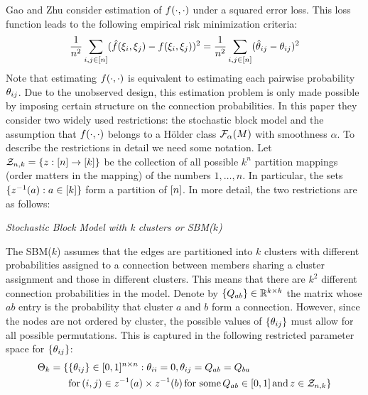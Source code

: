 \documentclass[11pt]{article}
\begin{document}
Gao and Zhu consider estimation of $f(\cdot, \cdot)$ under a squared error loss. This loss function leads to the following empirical risk minimization criteria:
\begin{equation}\label{eq:loss_func}
\frac{1}{n^2}\sum_{i, j \in \lbrack n\rbrack}(\hat{f}(\xi_i, \xi_j) - f(\xi_i, \xi_j))^2 =
\frac{1}{n^2}\sum_{i, j \in \lbrack n\rbrack}(\hat{\theta}_{ij} - \theta_{ij})^2
\end{equation}
Note that estimating $f(\cdot, \cdot)$ is equivalent to estimating each pairwise probability $\theta_{ij}$. Due to the unobserved design, this estimation problem is only made possible by imposing certain structure on the connection probabilities. In this paper they consider two widely used restrictions: the stochastic block model and the assumption that $f(\cdot, \cdot)$ belongs to a H\"older class $\mathcal{F}_{\alpha}(M)$ with smoothness $\alpha$. To describe the restrictions in detail we need some notation. Let $\mathcal{Z}_{n,k} = \{z : \lbrack n\rbrack \rightarrow \lbrack k\rbrack\}$ be the collection of all possible $k^n$ partition mappings (order matters in the mapping) of the numbers $1, \dots, n$. In particular, the sets $\{z^{-1}(a) : a \in \lbrack k\rbrack\}$ form a partition of $\lbrack n\rbrack$. In more detail, the two restrictions are as follows:

\begin{assump}\label{assump:sbm}
\textit{Stochastic Block Model with k clusters or SBM($k$)}

\noindent
The SBM($k$) assumes that the edges are partitioned into $k$ clusters with different probabilities assigned to a connection between members sharing a cluster assignment and those in different clusters. This means that there are $k^2$ different connection probabilities in the model. Denote by $\{Q_{ab}\} \in \mathbb{R}^{k \times k}$ the matrix whose $ab$ entry is the probability that cluster $a$ and $b$ form a connection. However, since the nodes are not ordered by cluster, the possible values of $\{\theta_{ij}\}$ must allow for all possible permutations. This is captured in the following restricted parameter space for $\{\theta_{ij}\}$:
\begin{equation}
\begin{aligned}
\Theta_k = \{&\{\theta_{ij}\} \in [0, 1]^{n \times n} : \theta_{ii} = 0, \theta_{ij} = Q_{ab} = Q_{ba}\\
    & \text{for} \, (i, j) \in z^{-1}(a) \times z^{-1}(b) \, \text{for some} \, Q_{ab} \in [0, 1] \, \text{and} \, z \in \mathcal{Z}_{n,k}\}
\end{aligned}
\end{equation}
\end{assump}
\end{document}
